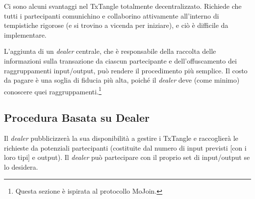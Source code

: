 Ci sono alcuni svantaggi nel TxTangle totalmente decentralizzato. Richiede che tutti i partecipanti comunichino e collaborino attivamente all'interno di tempistiche rigorose (e si trovino a vicenda per iniziare), e ciò è difficile da implementare.

L'aggiunta di un \emph{dealer} centrale, che è responsabile della raccolta delle informazioni sulla transazione da ciascun partecipante e dell'offuscamento dei raggruppamenti input/output, può rendere il procedimento più semplice. Il costo da pagare è una soglia di fiducia più alta, poiché il \emph{dealer} deve (come minimo) conoscere quei raggruppamenti.\footnote{Questa sezione è ispirata al protocollo MoJoin.}


\subsection{Procedura Basata su Dealer}
\label{subsec:dealer-procedure-txtangle}

Il \emph{dealer} pubblicizzerà la sua disponibilità a gestire i TxTangle e raccoglierà le richieste da potenziali partecipanti (costituite dal numero di input previsti [con i loro tipi] e output). Il \emph{dealer} può partecipare con il proprio set di input/output se lo desidera.

